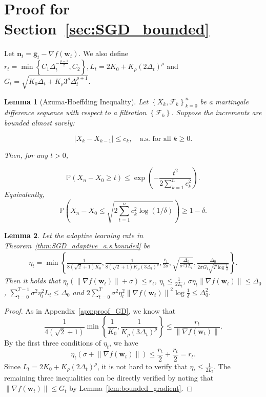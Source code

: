 \documentclass{article}
\newtheorem{lemma}{Lemma}
\newcommand{\Norm}[1]{\left\|#1\right\|}
\newcommand{\Kr}{K_{\rho}}
\newcommand{\paren}[1]{\left( #1 \right)}
\newcommand{\bw}{\mathbf{w}}
\newcommand{\bn}{\mathbf{n}}
\newcommand{\bg}{\mathbf{g}}
\begin{document}
\section{Proof for Section~\ref{sec:SGD_bounded}}
Let $\bn_t=\bg_t-\nabla f(\bw_t)$. We also define $r_t=\min\left\{C_1\Delta_t^{-\frac{\rho-1}{2}},C_2\right\},L_t=2K_0+\Kr\paren{2\Delta_t}^\rho$ and $G_t=\sqrt{K_0\Delta_t+\Kr 3^\rho\Delta_t^{\rho+1}}$.

\begin{lemma}[Azuma-Hoeffding Inequality]\label{lem:hoeffding}
    Let $\left\{X_k, \mathcal{F}_k\right\}_{k=0}^n$ be a martingale difference sequence with respect to a filtration $\left\{\mathcal{F}_k\right\}$. Suppose the increments are bounded almost surely:

    $$
    \left|X_k-X_{k-1}\right| \leq c_k, \quad \text{a.s. for all } k\geq 0. 
    $$
    
    
    Then, for any $t>0$,
    
    $$
    \mathbb{P}\left(X_n-X_0 \geq t\right) \leq \exp \left(-\frac{t^2}{2 \sum_{k=1}^n c_k^2}\right).
    $$
    Equivalently, 
    $$
    \mathbb{P}\left(X_n-X_0 \leq \sqrt{2 \sum_{t=1}^n c_k^2 \log (1 / \delta)}\right) \geq 1-\delta.
    $$
    
\end{lemma}

\begin{lemma}\label{lem:sgd_stepsize_adaptive_bounded}
    Let the adaptive learning rate in Theorem~\ref{thm:SGD_adaptive_a.s.bounded} be 
    \begin{align*}
        \eta_t=\min\left\{\frac{1}{8(\sqrt{2}+1)K_0},\frac{1}{8\paren{\sqrt{2}+1}\Kr\paren{3\Delta_t}^{\rho}},\frac{r_t}{2\sigma},\sqrt{\frac{\Delta_0}{\sigma^2TL_t}}, \frac{\Delta_0}{2\sigma G_t\sqrt{T\log\frac{1}{\delta}}}\right\}.
    \end{align*}
    Then it holds that
    $\eta_t\paren{\Norm{\nabla f(\bw_t)}+\sigma}\leq r_t$, $\eta_t\leq \frac{1}{2L_t}$, $\sigma\eta_t\Norm{\nabla f(\bw_t)}\leq \Delta_0$, $\sum_{t=0}^{T-1}\sigma^2\eta_t^2L_t\leq\Delta_0$ and $2\sum_{t=0}^{T}\sigma^2\eta_t^2\Norm{\nabla f(\bw_t)}^2\log\frac{1}{\delta}\leq\Delta_0^2$.
\end{lemma}
\begin{proof}
    As in Appendix~\ref{apx:proof_GD}, we know that
    $$\frac{1}{4\paren{\sqrt{2}+1}}\min\left\{\frac{1}{K_0},\frac{1}{\Kr\paren{3\Delta_t}^\rho}\right\}\leq \frac{r_t}{\Norm{\nabla f(\bw_t)}}.$$
    By the first three conditions of $\eta_t$, we have
    $$\eta_t\paren{\sigma+\Norm{\nabla f(\bw_t)}}\leq\frac{r_t}{2}+\frac{r_t}{2}=r_t. $$
    Since $L_t=2K_0+\Kr\paren{2\Delta_t}^\rho$, it is not hard to verify that $\eta_t\leq\frac{1}{2L_t}$. The remaining three inequalities can be directly verified by noting that $\Norm{\nabla f(\bw_t)}\leq G_t$ by Lemma~\ref{lem:bounded_gradient}.
\end{proof}
\end{document}
